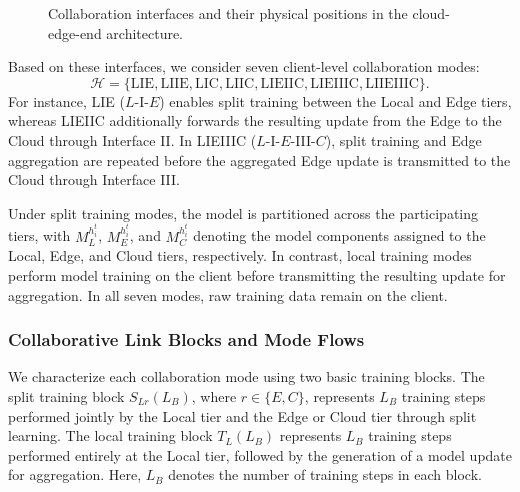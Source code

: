 \documentclass[5p,times]{elsarticle}
\theoremstyle{plain}
\theoremstyle{definition}
\theoremstyle{remark}
\begin{document}
\begin{figure}[t]

    \vspace{-0.15cm}
    \caption{Collaboration interfaces and their physical positions in the
    cloud-edge-end architecture.}
    \label{fig:collaboration_graph}
\end{figure}
Based on these interfaces, we consider seven
client-level collaboration modes:
\begin{equation}
\mathcal H=
\{\mathrm{LIE},\mathrm{LIIE},\mathrm{LIC},\mathrm{LIIC},
\mathrm{LIEIIC},\mathrm{LIEIIIC},\mathrm{LIIEIIIC}\}.
\label{eq:seven_modes}
\end{equation}
For instance, LIE (\(L\)-I-\(E\)) enables split
training between the Local and Edge tiers,
whereas LIEIIC additionally forwards the resulting
update from the Edge to the Cloud through
Interface II. In LIEIIIC
(\(L\)-I-\(E\)-III-\(C\)), split training and
Edge aggregation are repeated before the
aggregated Edge update is transmitted to the
Cloud through Interface III.

Under split training modes, the model is partitioned
across the participating tiers, with
\(M_L^{h_i^t}\), \(M_E^{h_i^t}\), and
\(M_C^{h_i^t}\) denoting the model components
assigned to the Local, Edge, and Cloud tiers,
respectively. In contrast, local training modes
perform model training on the client before
transmitting the resulting update for aggregation.
In all seven modes, raw training data remain
on the client.

\subsubsection{Collaborative Link Blocks and Mode Flows}
We characterize each collaboration mode using
two basic training blocks. The split training
block \(S_{Lr}(L_B)\), where \(r\in\{E,C\}\),
represents \(L_B\) training steps performed
jointly by the Local tier and the Edge or
Cloud tier through split learning. The local
training block \(T_L(L_B)\) represents
\(L_B\) training steps performed entirely
at the Local tier, followed by the generation
of a model update for aggregation. Here,
\(L_B\) denotes the number of training steps
in each block.
\end{document}
